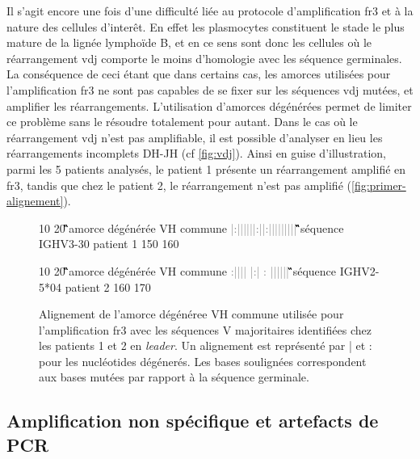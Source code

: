 Il s'agit encore une fois d'une difficulté liée au protocole d'amplification \gls{fr}3 et à la nature des cellules d'interêt. 
En effet les plasmocytes constituent le stade le plus mature de la lignée lymphoïde B, et en ce sens sont donc les cellules où le 
réarrangement \gls{vdj} comporte le moins d'homologie avec les séquence germinales. La conséquence de ceci étant que dans certains 
cas, les amorces utilisées pour l'amplification \gls{fr}3 ne sont pas capables de se fixer sur les séquences \gls{vdj} mutées, et 
amplifier les réarrangements. L'utilisation d'amorces dégénérées permet de limiter ce problème sans le résoudre totalement pour autant. 
Dans le cas où le réarrangement \gls{vdj} n'est pas amplifiable, il est possible d'analyser en lieu les réarrangements incomplets DH-JH 
(cf \autoref{fig:vdj}). Ainsi en guise d'illustration, parmi les 5 patients analysés, le patient 1 présente un réarrangement amplifié 
en \gls{fr}3, tandis que chez le patient 2, le réarrangement n'est pas amplifié (\autoref{fig:primer-alignement}).

\begin{figure}[H]
    \centering
    \begin{ColoredVerbatim}
                10         20 
        \G\Hbase\G\G\A\C\A\C\N\G\C\Y\G\T\G\T\A\T\T\A\C amorce dégénérée VH commune
        \textcolor{gray}{|:||||||:||:|||||||||}
        \G\A\G\G\A\C\A\C\G\G\C\T\G\T\G\T\A\T\T\A\C séquence IGHV3-30 patient 1
           150       160

                10        20 
        \G\Hbase\G\G\A\C\A\C\N\G\C\Y\G\T\G\T\A\T\T\A\C amorce dégénérée VH commune
        \textcolor{gray}{ :|||| |:| :   ||||||}
        \A\T\G\G\A\C\Tb\C\A\G\G\C\A\C\Tb\T\A\T\T\A\C séquence IGHV2-5*04 patient 2
              160       170
    \end{ColoredVerbatim}
    \caption{
        Alignement de l'amorce dégénéree VH commune utilisée pour l'amplification \gls{fr}3 
        avec les séquences V majoritaires identifiées chez les patients 1 et 2 en \textit{leader}. 
        Un alignement est représenté par | et : pour les nucléotides dégénerés. Les bases soulignées 
        correspondent aux bases mutées par rapport à la séquence germinale.
    }
    \label{fig:primer-alignement}
\end{figure}
    
\subsection{Amplification non spécifique et artefacts de PCR}

